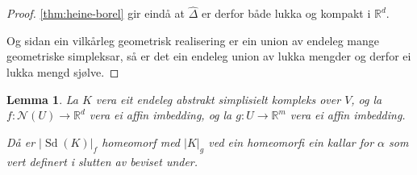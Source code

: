 \documentclass[a4paper, 12pt, norsk]{article}
\theoremstyle{plain}
\newtheorem{lemma}[theorem]{Lemma}
\theoremstyle{definition}
\newcommand{\Rb}{\mathbb{R}}
\newcommand{\Nc}{\mathcal{N}}
\newcommand{\gr}[1]{ \lvert #1 \rvert } %
\DeclareMathOperator{\Sd}{Sd} %
\begin{document}
\begin{proof}
	\autoref{thm:heine-borel} gir eindå at \( \hat{\Delta} \) er derfor både lukka og kompakt i \( \Rb^d \).

	Og sidan ein vilkårleg geometrisk realisering er ein union av endeleg mange geometriske simpleksar, så er det ein endeleg union av lukka mengder og derfor ei lukka mengd sjølve.
\end{proof}

\begin{lemma} \label{thm:alpha-homeomorfi}
	La \( K \) vera eit endeleg abstrakt simplisielt kompleks over \( V \), og la \( f: \Nc(U) \to \Rb^d \) vera ei affin imbedding, og la \( g: U \to \Rb^m \) vera ei affin imbedding.
	
	Då er \( \gr{\Sd(K)}_f  \) homeomorf med \( \gr{K}_g \) ved ein homeomorfi ein kallar for \( \alpha \) som vert definert i slutten av beviset under.
\end{lemma}
\end{document}
